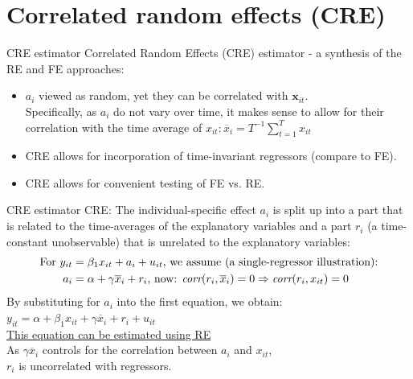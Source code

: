 \documentclass[usenames,dvipsnames]{beamer}
\newcommand{\mytikzmark}[2]{%
  \tikz[remember picture,inner sep=0pt,outer sep=0pt,baseline,anchor=base] 
    \node (#1) {\ensuremath{#2}};}
\begin{document}
\section{Correlated random effects (CRE)}
\begin{frame}{CRE estimator}
Correlated Random Effects (CRE) estimator - a synthesis of the RE and FE approaches: 
\vspace{0.5cm}
\begin{itemize}
\item $a_i$ viewed as random, yet they can be correlated with $\bm{x}_{it}$.\\
\vspace{0.2cm}
Specifically, as $a_i$ do not vary over time, it makes sense to allow for their correlation with the time average of $x_{it}:\overline{x}_i = T^{-1} \sum^T_{t=1}x_{it}$
\vspace{0.2cm}
\item CRE allows for incorporation of time-invariant regressors (compare to FE).
\vspace{0.2cm}
\item CRE allows for convenient testing of FE vs. RE.
\end{itemize}
\end{frame}
\begin{frame}{CRE estimator}
CRE: The individual-specific effect $a_i$ is split up into a part that is related to the time-averages of the explanatory variables and a part $r_i$ (a time-constant unobservable) that is unrelated to the explanatory variables: 
\begin{align*}
\textnormal{For } y_{it} & =  \beta_1 x_{it} + a_i + u_{it}\textnormal{, we assume (a single-regressor illustration):}\\ \vspace{0.3cm}
a_i & = \alpha + \gamma \overline{x}_i + r_i \textnormal{, now: } \textit{corr}(r_i, \overline{x}_i) = 0 \Rightarrow \mytikzmark{corr}{\textit{corr}(r_i,x_{it})} = 0\\
\end{align*}
By substituting for $a_i$ into the first equation, we obtain: \\
$y_{it} = \alpha + \beta_1 x_{it} + \gamma \overline{x}_i + r_i + u_{it}$ \\
\bigskip
\underline{This equation can be estimated using RE}\\
As $\gamma \overline{x}_i$ controls for the correlation between $a_i$ and $x_{it}$, \\$r_i$ is uncorrelated with regressors.
\end{frame}
\end{document}
